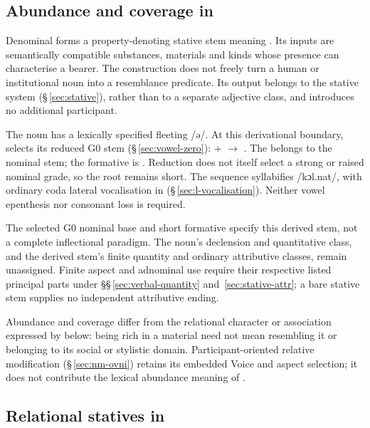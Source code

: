 \subsection{Abundance and coverage in }\label{sec:abundance-at}

Denominal  forms a property-denoting stative stem meaning
.
Its inputs are semantically compatible substances, materials and kinds whose
presence can characterise a bearer. The construction does not freely turn a
human or institutional noun into a resemblance predicate. Its output belongs
to the stative system (§\,\ref{sec:stative}), rather than to a separate
adjective class, and introduces no additional participant.

The noun   has a lexically specified fleeting
 /ə/. At this derivational boundary,  selects its reduced
G0 stem  (§\,\ref{sec:vowel-zero}):
\ex
{} +  $\rightarrow$ 
.
\xe
The  belongs to the nominal stem; the formative is .
Reduction does not itself select a strong or raised nominal grade, so the
root  remains short. The sequence syllabifies /kɔl.nat/, with
ordinary coda lateral vocalisation in
(§\,\ref{sec:l-vocalisation}). Neither vowel epenthesis nor consonant
loss is required.

The selected G0 nominal base and short formative specify this derived stem,
not a complete inflectional paradigm. The noun's declension and quantitative
class, and the derived stem's finite quantity and ordinary attributive
classes, remain unassigned. Finite aspect and adnominal use require their
respective listed principal parts under §§\,\ref{sec:verbal-quantity}
and~\ref{sec:stative-attr}; a bare stative stem supplies no independent
attributive ending.

Abundance and coverage differ from the relational character or association
expressed by  below: being rich in a material need not mean
resembling it or belonging to its social or stylistic domain.
Participant-oriented relative modification (§\,\ref{sec:nm-ovni}) retains
its embedded Voice and aspect selection; it does not contribute the lexical
abundance meaning of .

\subsection{Relational statives in }

